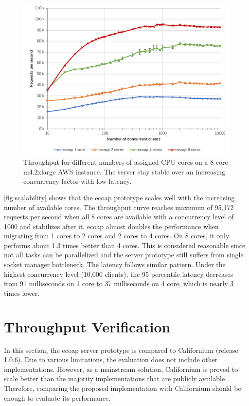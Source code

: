 \begin{figure}[!htbp]
\centering
\includegraphics[scale = 0.8]{vertical_scalability}
\caption[Throughput for different numbers of assigned CPU cores on a 8 core m4.2xlarge AWS instance]{Throughput for different numbers of assigned CPU cores on a 8 core m4.2xlarge AWS instance. The server stay stable over an increasing concurrency factor with low latency.}
\label{fig:scalability}
\end{figure}

\autoref{fig:scalability} shows that the ecoap prototype scales well with the increasing number of available cores. The throughput curve reaches maximum of 95,172 requests per second when all 8 cores are available with a concurrency level of 1000 and stabilizes after it. ecoap almost doubles the performance when migrating from 1 cores to 2 cores and 2 cores to 4 cores. On 8 cores, it only performs about 1.3 times better than 4 cores. This is considered reasonable since not all tasks can be parallelized and the server prototype still suffers from single socket manager bottleneck. The latency follows similar pattern. Under the highest concurrency level (10,000 clients), the 95 percentile latency decreases from 91 milliseconds on 1 core to 37 milliseconds on 4 core, which is nearly 3 times lower.

\section{Throughput Verification}

In this section, the ecoap server prototype is compared to Californium (release 1.0.6). Due to various limitations, the evaluation does not include other implementations. However, as a mainstream solution, Californium is proved to scale better than the majority implementations that are publicly available \autocite{lanter2013scalability}\autocite{kovatsch2014californium}\autocite{kovatsch2015scalable}. Therefore, comparing the proposed implementation with Californium should be enough to evaluate its performance. 

